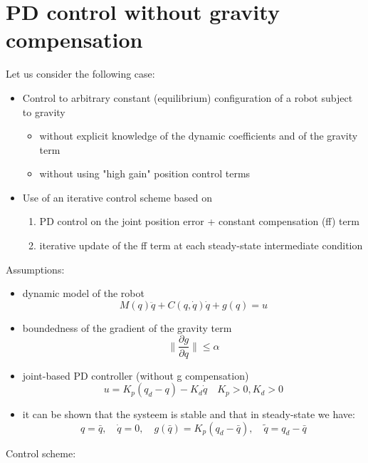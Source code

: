 \documentclass{book}
\begin{document}
\section{PD control without gravity compensation}
Let us consider the following case:
\begin{itemize}
    \item Control to arbitrary constant (equilibrium) configuration of a robot subject to gravity
    \begin{itemize}
        \item without explicit knowledge of the dynamic coefficients and of the gravity term
        \item without using "high gain" position control terms
    \end{itemize}
    \item Use of an iterative control scheme based on
    \begin{enumerate}
        \item PD control on the joint position error + constant compensation (ff) term 
        \item iterative update of the ff term at each steady-state intermediate condition
     \end{enumerate}
\end{itemize}
Assumptions: 
\begin{itemize}
    \item dynamic model of the robot \[
            M(q)\ddot{q}+C(q,\dot{q})\dot{q}+g(q)=u
        \]
    \item boundedness of the gradient of the gravity term \[
            \|\displaystyle\frac{\partial g}{\partial q}\| \leq \alpha
        \] 
    \item joint-based PD controller (without g compensation) \[
            u= K_p(q_d-q) -K_d\dot{q} \quad K_p>0,K_d> 0
        \]
    \item it can be shown that the systeem is stable and that in steady-state we have:\[
            q=\bar{q},\quad \dot{q}=0,\quad g(\bar{q})=K_p(q_d-\bar{q}),\quad \tilde{q}=q_d-\bar{q}
        \]
\end{itemize}
Control scheme:
\end{document}
